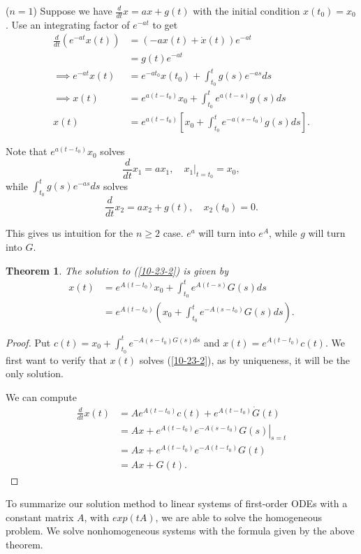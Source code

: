 \documentclass{tufte-handout}
\newtheorem{thm}{Theorem}[subsection]
\theoremstyle{definition}
\begin{document}
($n=1$) Suppose we have $\frac{d}{dt}x = ax + g(t)$ with the initial condition $x(t_0) = x_0$. Use an integrating factor of $e^{-at}$ to get
\begin{align*}
	\frac{d}{dt}\left( e^{-at} x(t) \right) &= (-ax(t) + \dot{x}(t))e^{-at} \\
											&= g(t) e^{-at} \\
											\implies e^{-at}x(t) &= e^{-at_0} x(t_0) + \int_{t_0}^{t} g(s) e^{-as}ds  \\
											\implies x(t) &= e^{a(t-t_0)}x_0 + \int_{t_0}^{t} e^{a(t-s)}g(s)ds \\
											x(t) &= e^{a(t-t_0)}\left[ x_0 + \int_{t_0}^{t} e^{-a(s-t_0)}g(s) ds \right] 
.\end{align*}

Note that $e^{a(t-t_0)}x_0$ solves \[
	\frac{d}{dt}x_1 = ax_1, \quad \left.x_1\right|_{t = t_0} = x_0
,\] while $\int_{t_0}^{t} g(s)e^{-as}ds$ solves \[
	\frac{d}{dt}x_2 = ax_2 + g(t), \quad x_2(t_0) = 0
.\] 

This gives us intuition for the $n \ge 2$ case. $e^a$ will turn into $e^{A}$, while $g$ will turn into $G$.
\begin{thm}
	The solution to (\ref{10-23-2}) is given by \begin{align*}
		x(t) &= e^{A(t-t_0)}x_0 + \int_{t_0}^{t} e^{A(t-s)}G(s)ds  \\
			 &= e^{A(t-t_0)} \left( x_0 + \int_{t_0}^{t} e^{-A(s-t_0)}G(s)ds  \right)
.\end{align*}
\end{thm}
\begin{proof}
	Put $c(t) = x_0 + \int_{t_0}^{t} e^{-A(s-t_0)G(s)ds} $ and $x(t) = e^{A(t-t_0)}c(t)$. We first want to verify that $x(t)$ solves (\ref{10-23-2}), as by uniqueness, it will be the only solution.

	We can compute
	\begin{align*}
		\frac{d}{dt}x(t) &= A e^{A(t-t_0)} c(t) + e^{A(t-t_0)}\dot{G}(t) \\
		&= Ax  + e^{A(t-t_0)} \left. e^{-A(s-t_0)}G(s)\right|_{s=t}\\
		&= Ax + e^{A(t-t_0)} e^{-A(t-t_0)}G(t) \\
		&= Ax + G(t)
	.\end{align*}
\end{proof}

To summarize our solution method to linear systems of first-order ODEs with a constant matrix $A$, with $exp(tA)$, we are able to solve the homogeneous problem. We solve nonhomogeneous systems with the formula given by the above theorem.
\end{document}
